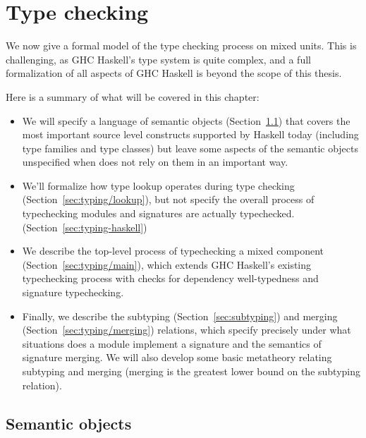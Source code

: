 \chapter{Type checking}
\label{sec:compiler}

We now give a formal model of the type checking process on mixed
units.  This is challenging, as GHC Haskell's type system is quite
complex, and a full formalization of all aspects of GHC Haskell is
beyond the scope of this thesis.

Here is a summary of what will be covered in this chapter:

\begin{itemize}
\item We will specify a language of semantic
objects (Section~\ref{sec:semantic-objects}) that covers the most
important source level constructs supported by Haskell today (including
type families and type classes) but leave some aspects of the semantic
objects unspecified when \Backpack{} does not rely on them in an important
way.
\item We'll formalize how type lookup operates during type checking (Section~\ref{sec:typing/lookup}),
but not specify the overall process of typechecking modules and signatures are actually typechecked. (Section~\ref{sec:typing-haskell})
\item We describe the top-level process of typechecking a mixed component (Section~\ref{sec:typing/main}), which extends GHC Haskell's existing typechecking process with checks for dependency well-typedness and signature typechecking.
\item Finally, we describe the subtyping (Section~\ref{sec:subtyping}) and merging (Section~\ref{sec:typing/merging}) relations, which specify precisely under what situations does a module implement a signature and the semantics of signature merging.  We will also develop some basic metatheory relating subtyping and merging (merging is the greatest lower bound on the subtyping relation).
\end{itemize}


\section{Semantic objects}
\label{sec:semantic-objects}

